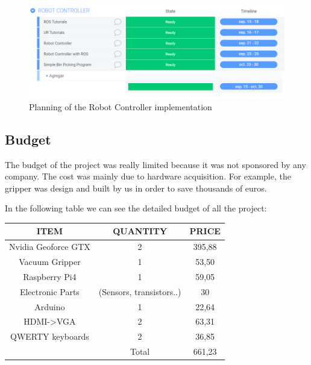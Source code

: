 		\begin{figure}
			\centering
			\includegraphics[width=0.85\linewidth]{Images/planning3}
			\caption[Planing Robot Controller]{Planning of the Robot Controller implementation}
			\label{fig:planning3}
		\end{figure}
		
		\subsection{Budget}
			The budget of the project was really limited because it was not sponsored by any company. The cost was mainly due to hardware acquisition. For example, the gripper was design and built by us in order to save thousands of euros.
			
			In the following table we can see the detailed budget of all the project:
			
			\begin{center}
				\begin{tabular}{ccc}
					\toprule 
					ITEM & QUANTITY & PRICE  \\ 
					\midrule
					Nvidia Geoforce GTX & 2 & 395,88 \\
					\rowcolor{black!20}Vacuum Gripper & 1 & 53,50 \\
					Raspberry Pi4 & 1 & 59,05 \\
					\rowcolor{black!20}Electronic Parts & (Sensors, transistors..) & 30 \\
					Arduino  & 1 & 22,64 \\
					\rowcolor{black!20}HDMI->VGA & 2 & 63,31 \\
					QWERTY keyboards & 2 & 36,85 \\
					\bottomrule
					& Total & 661,23 \\
				\end{tabular}
				\label{tab:budget}
			\end{center}
			